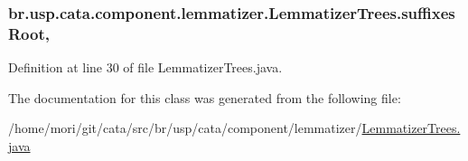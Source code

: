 \hypertarget{classbr_1_1usp_1_1cata_1_1component_1_1lemmatizer_1_1_lemmatizer_trees_a6e88697661cf7e6cfc419587f8e0cfd8}{
\subsubsection[{suffixes\+Root}]{ br.\+usp.\+cata.\+component.\+lemmatizer.\+Lemmatizer\+Trees.\+suffixes\+Root\hspace{0.3cm}{\ttfamily [static]}, {\ttfamily [private]}}}\label{classbr_1_1usp_1_1cata_1_1component_1_1lemmatizer_1_1_lemmatizer_trees_a6e88697661cf7e6cfc419587f8e0cfd8}


Definition at line 30 of file Lemmatizer\+Trees.\+java.



The documentation for this class was generated from the following file\+:\begin{DoxyCompactItemize}
\item 
/home/mori/git/cata/src/br/usp/cata/component/lemmatizer/\hyperlink{_lemmatizer_trees_8java}{Lemmatizer\+Trees.\+java}\end{DoxyCompactItemize}
